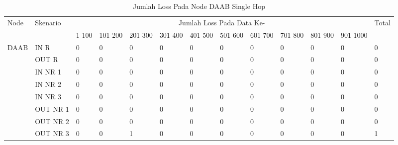 \begin{table}[H]
  \centering
  \caption{Jumlah Loss Pada Node DAAB Single Hop}
    \begin{tabular}{|p{1cm}|p{1.9cm}|p{0.6cm}|p{0.6cm}|p{0.6cm}|p{0.6cm}|p{0.6cm}|p{0.6cm}|p{0.6cm}|p{0.6cm}|p{0.6cm}|p{0.6cm}|p{1cm}|}
    \hline
        \multirow{2}{*}{Node}&\multirow{2}{*}{Skenario}&\multicolumn{10}{|c|}{Jumlah Loss Pada Data Ke-}&\multirow{2}{*}{Total} \\\cline{3-12}
          & & 1-100 & 101-200 & 201-300 & 301-400 & 401-500 & 501-600 & 601-700 & 701-800 & 801-900 & 901-1000 & \\
        \hline
    \multirow{8}{*}{DAAB}  
    & IN R  & 0     & 0     & 0     & 0     & 0     & 0     & 0     & 0     & 0     & 0     & 0 \\
    & OUT R & 0     & 0     & 0     & 0     & 0     & 0     & 0     & 0     & 0     & 0     & 0 \\
    & IN NR 1 & 0     & 0     & 0     & 0     & 0     & 0     & 0     & 0     & 0     & 0     & 0 \\
    & IN NR 2 & 0     & 0     & 0     & 0     & 0     & 0     & 0     & 0     & 0     & 0     & 0 \\
    & IN NR 3 & 0     & 0     & 0     & 0     & 0     & 0     & 0     & 0     & 0     & 0     & 0 \\
    & OUT NR 1 & 0     & 0     & 0     & 0     & 0     & 0     & 0     & 0     & 0     & 0     & 0 \\
    & OUT NR 2 & 0     & 0     & 0     & 0     & 0     & 0     & 0     & 0     & 0     & 0     & 0 \\
    & OUT NR 3 & 0     & 0     & 1     & 0     & 0     & 0     & 0     & 0     & 0     & 0     & 1 \\
    
    \hline
    \end{tabular}%
  \label{tab:addlabel}%
\end{table}%

